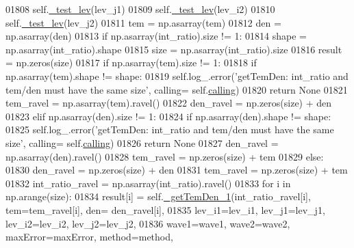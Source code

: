 \begin{DoxyCode}
{{01808         self.\hyperlink{classpyneb_1_1core_1_1pynebcore_1_1_atom_ade3de73e8bdb814d01d2d9af98eba87f}{\_test\_lev}(lev\_j1)
01809         self.\hyperlink{classpyneb_1_1core_1_1pynebcore_1_1_atom_ade3de73e8bdb814d01d2d9af98eba87f}{\_test\_lev}(lev\_i2)
01810         self.\hyperlink{classpyneb_1_1core_1_1pynebcore_1_1_atom_ade3de73e8bdb814d01d2d9af98eba87f}{\_test\_lev}(lev\_j2)
01811         tem = np.asarray(tem)
01812         den = np.asarray(den)
01813         \textcolor{keywordflow}{if} np.asarray(int\_ratio).size != 1:
01814             shape = np.asarray(int\_ratio).shape
01815             size = np.asarray(int\_ratio).size
01816             result = np.zeros(size) 
01817             \textcolor{keywordflow}{if} np.asarray(tem).size != 1:
01818                 \textcolor{keywordflow}{if} np.asarray(tem).shape != shape:
01819                     self.log\_.error(\textcolor{stringliteral}{'getTemDen: int\_ratio and tem/den must have the same size'}, calling=
      self.\hyperlink{classpyneb_1_1core_1_1pynebcore_1_1_atom_a373b7735acf4f528b54bddf373ad67a1}{calling})
01820                     \textcolor{keywordflow}{return} \textcolor{keywordtype}{None}
01821                 tem\_ravel = np.asarray(tem).ravel()
01822                 den\_ravel = np.zeros(size) + den
01823             \textcolor{keywordflow}{elif} np.asarray(den).size != 1:
01824                 \textcolor{keywordflow}{if} np.asarray(den).shape != shape:
01825                     self.log\_.error(\textcolor{stringliteral}{'getTemDen: int\_ratio and tem/den must have the same size'}, calling=
      self.\hyperlink{classpyneb_1_1core_1_1pynebcore_1_1_atom_a373b7735acf4f528b54bddf373ad67a1}{calling})
01826                     \textcolor{keywordflow}{return} \textcolor{keywordtype}{None}
01827                 den\_ravel = np.asarray(den).ravel()
01828                 tem\_ravel = np.zeros(size) + tem
01829             \textcolor{keywordflow}{else}:
01830                 den\_ravel = np.zeros(size) + den
01831                 tem\_ravel = np.zeros(size) + tem
01832             int\_ratio\_ravel = np.asarray(int\_ratio).ravel()
01833             \textcolor{keywordflow}{for} i \textcolor{keywordflow}{in} np.arange(size):
01834                 result[i] = self.\hyperlink{classpyneb_1_1core_1_1pynebcore_1_1_atom_ad1d75f64b27a6acee079b5738b69dabe}{\_getTemDen\_1}(int\_ratio\_ravel[i], tem=tem\_ravel[i], den=
      den\_ravel[i],
01835                                            lev\_i1=lev\_i1, lev\_j1=lev\_j1, lev\_i2=lev\_i2, lev\_j2=lev\_j2,
01836                                            wave1=wave1, wave2=wave2, maxError=maxError, method=method,
}}
\end{DoxyCode}
